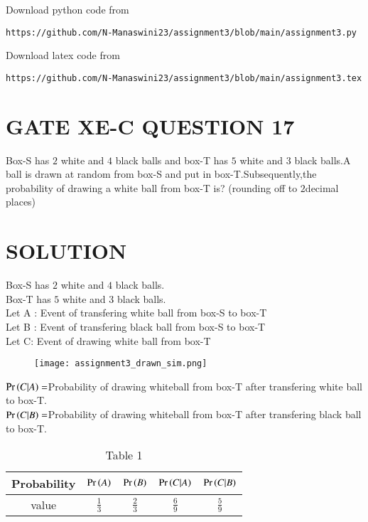 \documentclass[journal,12pt,twocolumn]{IEEEtran}
\begin{document}
\renewcommand{\thefigure}{\theenumi}
\renewcommand{\thetable}{\theenumi}
Download python code from 
\begin{lstlisting}
https://github.com/N-Manaswini23/assignment3/blob/main/assignment3.py
\end{lstlisting}
%
Download latex code from 
\begin{lstlisting}
https://github.com/N-Manaswini23/assignment3/blob/main/assignment3.tex
\end{lstlisting}
%

\section*{GATE XE-C QUESTION 17}
Box-S has $2$ white and $4$ black balls and box-T has $5$ white and $3$ black balls.A ball is drawn at random from box-S and put in box-T.Subsequently,the probability of drawing a white ball from box-T is? (rounding off to $ 2 $decimal places)

\section*{SOLUTION}
Box-S has $2$ white and $4$ black balls.\\
Box-T has $5$ white and $3$ black balls.\\
Let A : Event of transfering white ball from box-S to box-T\\
Let B : Event of transfering black ball from box-S to box-T\\
Let C: Event of drawing white ball from box-T\\


\begin{figure}[htb!]
\begin{center}
\texttt{[image: assignment3\_drawn\_sim.png]}
\end{center}
\end{figure}

$\Pr\left(C|A\right)=$Probability of drawing whiteball from box-T after transfering white ball to box-T.\\
$\Pr\left(C|B\right)=$Probability of drawing whiteball from box-T after transfering black ball to box-T.\\
\begin{table}[h!]
\resizebox{9.5cm}{!}
{ 
\begin{tabular}{|c|c|c|c|c|}
\hline
Probability & $\Pr\left(A\right)$ & $\Pr\left(B\right)$ & $\Pr\left(C|A\right)$ & $\Pr\left(C|B\right)$ \\
\hline
value & $\frac{1}{3}$ &  $\frac{2}{3}$ &  $\frac{6}{9}$ &  $\frac{5}{9}$ \\
\hline
\end{tabular}
}
\caption{Table 1} 
\label{tab:1}
\end{table}
\end{document}
